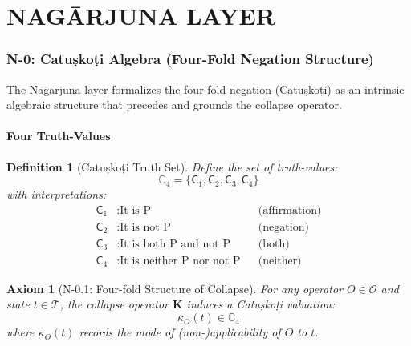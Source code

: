 \documentclass[12pt, oneside]{article}
\newtheorem{definition}[theorem]{Definition}
\newtheorem{axiom}[theorem]{Axiom}
\newcommand{\K}{\mathbf{K}}
\newcommand{\T}{\mathcal{T}}
\newcommand{\Opr}{\mathcal{O}}
\newcommand{\catkoone}{\mathsf{C}_1}
\newcommand{\catkotwo}{\mathsf{C}_2}
\newcommand{\catkothree}{\mathsf{C}_3}
\newcommand{\catkofour}{\mathsf{C}_4}
\begin{document}
\begin{center}
\end{center}

\newpage

\part{NAGĀRJUNA LAYER}

\section{N-0: Catuṣkoṭi Algebra (Four-Fold Negation Structure)}

The Nāgārjuna layer formalizes the four-fold negation (Catuṣkoṭi) as an intrinsic algebraic structure that precedes and grounds the collapse operator.

\subsection{Four Truth-Values}

\begin{definition}[Catuṣkoṭi Truth Set]
Define the set of truth-values:
\[
\mathbb{C}_4 = \{\catkoone, \catkotwo, \catkothree, \catkofour\}
\]
with interpretations:
\begin{align*}
\catkoone &: \text{It is P} &&\text{(affirmation)}\\
\catkotwo &: \text{It is not P} &&\text{(negation)}\\
\catkothree &: \text{It is both P and not P} &&\text{(both)}\\
\catkofour &: \text{It is neither P nor not P} &&\text{(neither)}
\end{align*}
\end{definition}

\begin{axiom}[N-0.1: Four-fold Structure of Collapse]
For any operator $O \in \Opr$ and state $t \in \T$, the collapse operator $\K$ induces a Catuṣkoṭi valuation:
\[
\kappa_O(t) \in \mathbb{C}_4
\]
where $\kappa_O(t)$ records the mode of (non-)applicability of $O$ to $t$.
\end{axiom}
\end{document}
